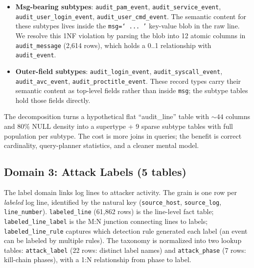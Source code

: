 \begin{itemize}
  \item \textbf{Msg-bearing subtypes}: \texttt{audit\_pam\_event},
    \texttt{audit\_service\_event}, \texttt{audit\_user\_login\_event},
    \texttt{audit\_user\_cmd\_event}. The semantic content for these
    subtypes lives inside the \texttt{msg=` ... '} key-value blob in the
    raw line. We resolve this 1NF violation by parsing the blob into 12
    atomic columns in \texttt{audit\_message} (2{,}614 rows), which holds
    a 0..1 relationship with \texttt{audit\_event}.
  \item \textbf{Outer-field subtypes}: \texttt{audit\_login\_event},
    \texttt{audit\_syscall\_event}, \texttt{audit\_avc\_event},
    \texttt{audit\_proctitle\_event}. These record types carry their
    semantic content as top-level fields rather than inside \texttt{msg};
    the subtype tables hold those fields directly.
\end{itemize}

The decomposition turns a hypothetical flat ``audit\_line'' table with
$\sim 44$ columns and 80\% NULL density into a supertype + 9 sparse
subtype tables with full population per subtype. The cost is more joins
in queries; the benefit is correct cardinality, query-planner statistics,
and a cleaner mental model.

\subsection{Domain 3: Attack Labels (5 tables)}
The label domain links log lines to attacker activity. The grain is one
row per \emph{labeled} log line, identified by the natural key
(\texttt{source\_host}, \texttt{source\_log}, \texttt{line\_number}).
\texttt{labeled\_line} (61{,}862 rows) is the line-level fact table;
\texttt{labeled\_line\_label} is the M:N junction connecting lines to
labels; \texttt{labeled\_line\_rule} captures which detection rule
generated each label (an event can be labeled by multiple rules). The
taxonomy is normalized into two lookup tables: \texttt{attack\_label}
(22 rows: distinct label names) and \texttt{attack\_phase} (7 rows:
kill-chain phases), with a 1:N relationship from phase to label.

